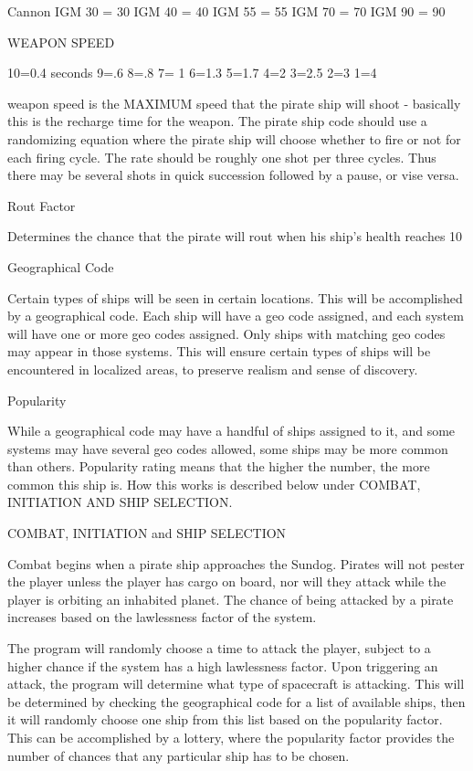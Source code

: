 \begin{itemize}
Cannon
	IGM 30 = 30
	IGM 40 = 40
	IGM 55 = 55
	IGM 70 = 70
	IGM 90 = 90

WEAPON SPEED 
	
10=0.4 seconds
9=.6
8=.8
7= 1
6=1.3
5=1.7
4=2
3=2.5
2=3
1=4


weapon speed is the MAXIMUM speed that the pirate ship will shoot - basically this is the recharge time for the weapon. The pirate ship code should use a randomizing equation where the pirate ship will choose whether to fire or not for each firing cycle. The rate should be roughly one shot per three cycles. Thus there may be several shots in quick succession followed by a pause, or vise versa. 

Rout Factor

Determines the chance that the pirate will rout when his ship’s health reaches 10%

Geographical Code

Certain types of ships will be seen in certain locations. This will be accomplished by a geographical code. Each ship will have a geo code assigned, and each system will have one or more geo codes assigned. Only ships with matching geo codes may appear in those systems. This will ensure certain types of ships will be encountered in localized areas, to preserve realism and sense of discovery. 

Popularity

While a geographical code may have a handful of ships assigned to it, and some systems may have several geo codes allowed, some ships may be more common than others. Popularity rating means that the higher the number, the more common this ship is. How this works is described below under COMBAT, INITIATION AND SHIP SELECTION. 




COMBAT, INITIATION and SHIP SELECTION

Combat begins when a pirate ship approaches the Sundog. Pirates will not pester the player unless the player has cargo on board, nor will they attack while the player is orbiting an inhabited planet. The chance of being attacked by a pirate increases based on the lawlessness factor of the system. 

The program will randomly choose a time to attack the player, subject to a higher chance if the system has a high lawlessness factor. Upon triggering an attack, the program will determine what type of spacecraft is attacking. This will be determined by checking the geographical code for a list of available ships, then it will randomly choose one ship from this list based on the popularity factor. This can be accomplished by a lottery, where the popularity factor provides the number of chances that any particular ship has to be chosen. 


\end{itemize}
